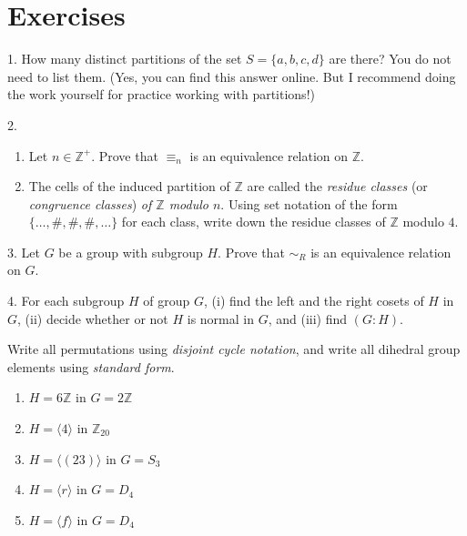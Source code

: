 \documentclass[10pt,openany,oneside]{book}
\theoremstyle{plain}
\theoremstyle{definition}
\theoremstyle{definition}
\theoremstyle{definition}
\theoremstyle{definition}
\numberwithin{equation}{section}
\def\Z{\mathbb{Z}}
\def\simr{\sim_R}
\begin{document}
\section[{Exercises}]{Exercises}\label{exercises-8}
\begin{exerciselist}
\item[1.]\hypertarget{exercise-50}{}How many distinct partitions of the set \(S=\{a,b,c,d\}\) are there? You do not need to list them. (Yes, you can find this answer online. But I recommend doing the work yourself for practice working with partitions!)%
\par\smallskip
\item[2.]\hypertarget{exercise-51}{}\leavevmode%
\begin{enumerate}[label=(\alph*)]
\item\hypertarget{li-416}{}Let  \(n\in \Z^+\). Prove that  \(\equiv_n\) is an equivalence relation on \(\Z\).%
\item\hypertarget{li-417}{}The cells of the induced partition of \(\Z\) are called the \emph{residue classes} (or \emph{congruence classes}) \emph{of \(\Z\) modulo \(n\)}.  Using set notation of the form \(\{\ldots,\#, \#,\#,\ldots\}\) for each class, write down the residue classes of \(\Z\) modulo \(4\).%
\end{enumerate}
%
\par\smallskip
\item[3.]\hypertarget{exercise-52}{}Let \(G\) be a group with subgroup \(H\). Prove that \(\simr\) is an equivalence relation on \(G\).%
\par\smallskip
\item[4.]\hypertarget{exercise-53}{}For each subgroup \(H\) of group \(G\), (i) find the left and the right cosets of \(H\) in \(G\), (ii) decide whether or not \(H\) is normal in \(G\), and (iii) find \((G:H)\).%
\par
Write all permutations using \emph{disjoint cycle notation}, and write all dihedral group elements using \emph{standard form}. \leavevmode%
\begin{enumerate}[label=(\alph*)]
\item\hypertarget{li-420}{}\(H=6\Z\) in \(G=2\Z\)%
\item\hypertarget{li-421}{}\(H=\langle 4\rangle\) in \(\Z_{20}\)%
\item\hypertarget{li-422}{}\(H=\langle (23)\rangle\) in \(G=S_3\)%
\item\hypertarget{li-423}{}\(H=\langle r\rangle\) in \(G=D_4\)%
\item\hypertarget{li-424}{}\(H=\langle f\rangle\) in \(G=D_4\)%

\end{enumerate}
\end{exerciselist}
\end{document}
